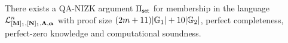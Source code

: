 \begin{theorem} \label{theo:aggset} There exists a QA-NIZK argument $\Pi_{\mathsf{set}}$ for membership in the language $\mathcal{L}_{[\mathbf{{M}}]_1,[\mathbf{{N}}]_1,\mathbf{{\Lambda}},{\boldsymbol \alpha}}^n$ with proof size  $(2{m}+11)|\mathbb{G}_1|+10|\mathbb{G}_2|$, perfect completeness, perfect-zero knowledge and computational soundness. 
\end{theorem}

